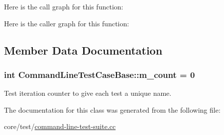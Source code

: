 Here is the call graph for this function\+:




Here is the caller graph for this function\+:




\subsection{Member Data Documentation}
\subsubsection[{\texorpdfstring{m\+\_\+count}{m_count}}]{\setlength{\rightskip}{0pt plus 5cm}int Command\+Line\+Test\+Case\+Base\+::m\+\_\+count = 0\hspace{0.3cm}{\ttfamily [static]}}\hypertarget{classCommandLineTestCaseBase_ac14c386e0b97357f0189d4938abcd791}{}\label{classCommandLineTestCaseBase_ac14c386e0b97357f0189d4938abcd791}
Test iteration counter to give each test a unique name. 

The documentation for this class was generated from the following file\+:\begin{DoxyCompactItemize}
\item 
core/test/\hyperlink{command-line-test-suite_8cc}{command-\/line-\/test-\/suite.\+cc}\end{DoxyCompactItemize}
